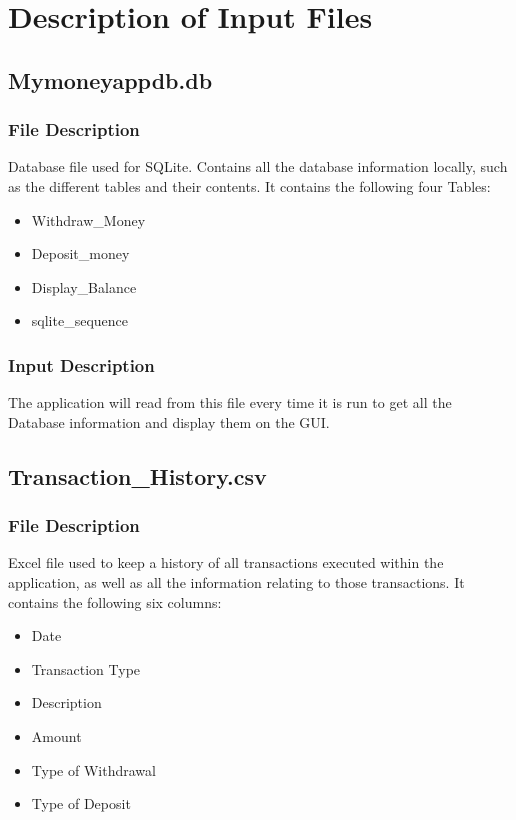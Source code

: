 \documentclass[12pt]{article}
\begin{document}
\appendix

\section{Description of Input Files}

\subsection{Mymoneyappdb.db}

\subsubsection{File Description}
Database file used for SQLite. Contains all the database information locally, such as the different tables and their contents. It contains the following four Tables:
\begin{itemize}
  \item Withdraw\_Money
  \item Deposit\_money
  \item Display\_Balance
  \item sqlite\_sequence
\end{itemize}

\subsubsection{Input Description}
The application will read from this file every time it is run to get all the Database information and display them on the GUI.

\subsection{Transaction\_History.csv}

\subsubsection{File Description}
Excel file used to keep a history of all transactions executed within the application, as well as all the information relating to those transactions. It contains the following six columns:
\begin{itemize}
  \item Date
  \item Transaction Type
  \item Description
  \item Amount
  \item Type of Withdrawal
  \item Type of Deposit
\end{itemize}
\end{document}
